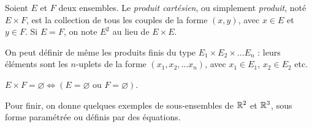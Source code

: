 \begin{definition}
Soient $E$ et $F$ deux ensembles. Le \emph{produit cartésien}, ou simplement \emph{produit}, noté $E\times F$, est la collection de tous les couples  de la forme $(x,y)$, avec $x\in E$ et $y\in F$. Si $E=F$, on note $E^2$ au lieu de $E\times E$. 

On peut définir de même les produits finis du type $E_1\times E_2 \times ... E_n$ : leurs éléments sont les $n$-uplets de la forme $(x_1, x_2, ... x_n)$, avec $x_1\in E_1$, $x_2\in E_2$ etc. 
\end{definition}

\begin{remarque}
$E\times F = \varnothing \iff \left( E=\varnothing\text{ ou }F=\varnothing\right)$.
\end{remarque}



Pour finir, on donne quelques exemples de sous-ensembles de $\mathbb{R}^2$ et $\mathbb{R}^3$, sous forme paramétrée ou définis par des équations.

